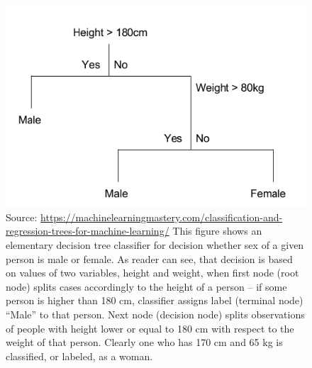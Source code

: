 \documentclass[12pt, twoside]{book} %
\begin{document}
\begin{figure}[H]
\includegraphics[width=\textwidth]{decisiontree.png}
\label{Figure 1.1}
{\small Source: \url{https://machinelearningmastery.com/classification-and-regression-trees-for-machine-learning/} \newline
This figure shows an elementary decision tree classifier for decision whether sex of a given person is male or female. As reader can see, that decision is based on values of two variables, height and weight, when first node (root node) splits cases accordingly to the height of a person – if some person is higher than 180 cm, classifier assigns label (terminal node) “Male” to that person. Next node (decision node) splits observations of people with height lower or equal to 180 cm with respect to the weight of that person. Clearly one who has 170 cm and 65 kg is classified, or labeled, as a woman.}
\end{figure}
\end{document}
